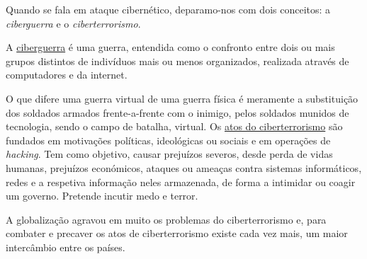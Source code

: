 \documentclass{report}
\begin{document}
\par
Quando se fala em ataque cibernético, deparamo-nos com dois conceitos: a \textit{ciberguerra} e o \textit{ciberterrorismo}. \par
A \underline{ciberguerra} é uma guerra, entendida como o confronto entre dois ou mais grupos distintos de indivíduos mais ou menos organizados, realizada através de computadores e da internet.\par
O que difere uma guerra virtual de uma guerra física é meramente a substituição dos soldados armados frente-a-frente com o inimigo, pelos soldados munidos de tecnologia, sendo o campo de batalha,  virtual.
Os \underline{atos do ciberterrorismo} são fundados em motivações políticas, ideológicas ou sociais e em operações de \textit{hacking}. Tem como objetivo, causar prejuízos severos, desde perda de vidas humanas, prejuízos económicos, ataques ou ameaças contra sistemas informáticos, redes e a respetiva informação neles armazenada, de forma a intimidar ou coagir um governo. Pretende incutir medo e terror.\par
A globalização agravou em muito os problemas do ciberterrorismo e, para combater e precaver os atos de ciberterrorismo                                                                                                                                                                                                                                                                                existe cada vez mais, um maior intercâmbio entre os países.


\end{document}
